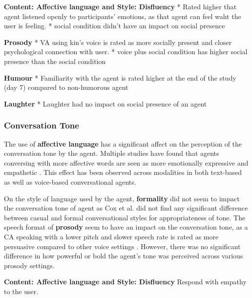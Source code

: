 \textbf{Content: Affective language and Style: Disfluency}
* Rated higher that agent listened openly to participants' emotions, as that agent can feel waht the user is feeling. \cite{hu2021enhancing}\cmt{[56]}
* social condition didn't have an impact on social presence \cite{lubold2016effects}\cmt{[86]}

\textbf{Prosody}
* VA using kin's voice is rated as more socially present and closer psychological connection with user. \cite{chan2021kinvoices}\cmt{[74]}
* voice plus social condition has higher social presence than the social condition \cite{lubold2016effects}\cmt{[86]}

\textbf{Humour}
* Familiarity with the agent is rated higher at the end of the study (day 7) compared to non-humorous agent \cite{go2021conversational}\cmt{[80]}

\textbf{Laughter}
* Laughter had no impact on social presence of an agent \cite{niewiadomski2013laugh}\cmt{[85]}

\subsubsection{Conversation Tone}

The use of \textbf{affective language} has a significant affect on the perception of the conversation tone by the agent. Multiple studies have found that agents conversing with more affective words are seen as more emotionally expressive and empathetic \cite{daher2020empathic}\cmt{[58]}\cite{diederich2019emulating}\cmt{[25]}\cite{yang2017perceived}\cmt{[44]}\cite{zhu2022effects}\cmt{[26]}. This effect has been observed across modalities in both text-based as well as voice-based conversational agents.

On the style of language used by the agent, \textbf{formality} did not seem to impact the conversation tone of agent as Cox et al. \cite{cox2022does}\cmt{[27]} did not find any significant difference between casual and formal conversational styles for appropriateness of tone. The speech format of \textbf{prosody} seem to have an impact on the conversation tone, as a CA speaking with a lower pitch and slower speech rate is rated as more persuasive compared to other voice settings \cite{dubiel2020persuasive}\cmt{[60]}. However, there was no significant difference in how powerful or bold the agent's tone was perceived across various prosody settings.

\textbf{Content: Affective language and Style: Disfluency}
Respond with empathy to the user. \cite{hu2021enhancing}\cmt{[56]}

